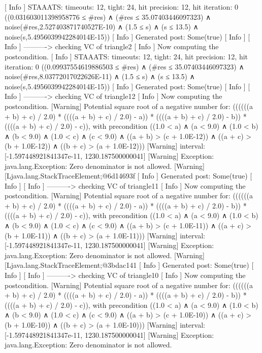 [ Info  ] STAAATS: timeouts: 12, tight: 24, hit precision: 12, hit iteration: 0
((0.031603011398958776 ≤ #res) ∧ (#res ≤ 35.07403446097323) ∧ noise(#res,2.527403871740527E-10) ∧ (1.5 ≤ s) ∧ (s ≤ 13.5) ∧ noise(s,5.4956039942284014E-15))
[ Info  ] Generated post: Some(true)
[ Info  ] 
[ Info  ] ----------> checking VC of triangle2
[ Info  ] Now computing the postcondition.
[ Info  ] STAAATS: timeouts: 12, tight: 24, hit precision: 12, hit iteration: 0
((0.09937554619886503 ≤ #res) ∧ (#res ≤ 35.07403446097323) ∧ noise(#res,8.03772017022626E-11) ∧ (1.5 ≤ s) ∧ (s ≤ 13.5) ∧ noise(s,5.4956039942284014E-15))
[ Info  ] Generated post: Some(true)
[ Info  ] 
[ Info  ] ----------> checking VC of triangle12
[ Info  ] Now computing the postcondition.
[Warning] Potential square root of a negative number for: ((((((a + b) + c) / 2.0) * ((((a + b) + c) / 2.0) - a)) * ((((a + b) + c) / 2.0) - b)) * ((((a + b) + c) / 2.0) - c)),
          with precondition ((1.0 < a) ∧ (a < 9.0) ∧ (1.0 < b) ∧ (b < 9.0) ∧ (1.0 < c) ∧ (c < 9.0) ∧ ((a + b) > (c + 1.0E-12)) ∧ ((a + c) > (b + 1.0E-12)) ∧ ((b + c) > (a + 1.0E-12)))
[Warning] interval: [-1.597448921841347e-11, 1230.187500000041]
[Warning] Exception: java.lang.Exception: Zero denominator is not allowed.
[Warning] [Ljava.lang.StackTraceElement;@6d14693f
[ Info  ] Generated post: Some(true)
[ Info  ] 
[ Info  ] ----------> checking VC of triangle11
[ Info  ] Now computing the postcondition.
[Warning] Potential square root of a negative number for: ((((((a + b) + c) / 2.0) * ((((a + b) + c) / 2.0) - a)) * ((((a + b) + c) / 2.0) - b)) * ((((a + b) + c) / 2.0) - c)),
          with precondition ((1.0 < a) ∧ (a < 9.0) ∧ (1.0 < b) ∧ (b < 9.0) ∧ (1.0 < c) ∧ (c < 9.0) ∧ ((a + b) > (c + 1.0E-11)) ∧ ((a + c) > (b + 1.0E-11)) ∧ ((b + c) > (a + 1.0E-11)))
[Warning] interval: [-1.597448921841347e-11, 1230.187500000041]
[Warning] Exception: java.lang.Exception: Zero denominator is not allowed.
[Warning] [Ljava.lang.StackTraceElement;@3bdac141
[ Info  ] Generated post: Some(true)
[ Info  ] 
[ Info  ] ----------> checking VC of triangle10
[ Info  ] Now computing the postcondition.
[Warning] Potential square root of a negative number for: ((((((a + b) + c) / 2.0) * ((((a + b) + c) / 2.0) - a)) * ((((a + b) + c) / 2.0) - b)) * ((((a + b) + c) / 2.0) - c)),
          with precondition ((1.0 < a) ∧ (a < 9.0) ∧ (1.0 < b) ∧ (b < 9.0) ∧ (1.0 < c) ∧ (c < 9.0) ∧ ((a + b) > (c + 1.0E-10)) ∧ ((a + c) > (b + 1.0E-10)) ∧ ((b + c) > (a + 1.0E-10)))
[Warning] interval: [-1.597448921841347e-11, 1230.187500000041]
[Warning] Exception: java.lang.Exception: Zero denominator is not allowed.
